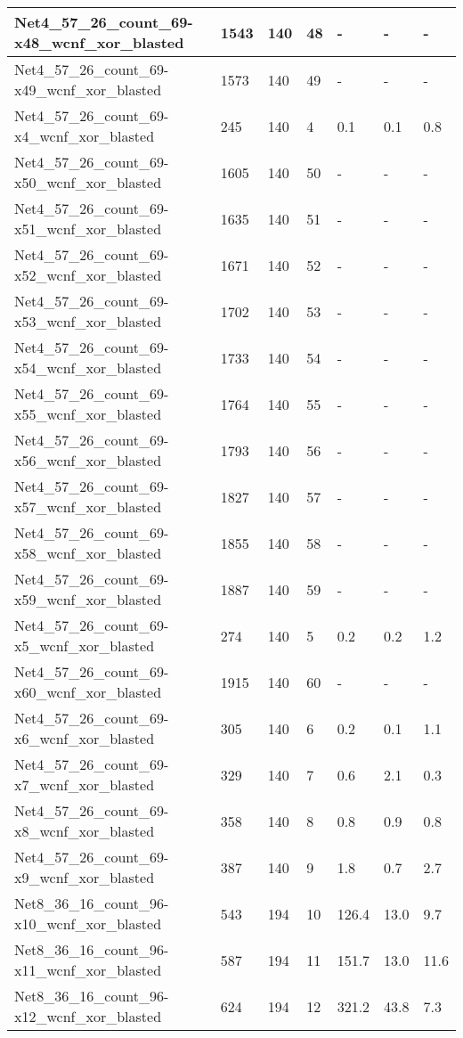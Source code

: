 \begin{scriptsize}
\begin{longtable}{|p{5cm}|l|l|l|l|l|l|}
Net4\_57\_26\_count\_69-x48\_wcnf\_xor\_blasted&1543&140&48&-&-&- \\ \hline 
Net4\_57\_26\_count\_69-x49\_wcnf\_xor\_blasted&1573&140&49&-&-&- \\ \hline 
Net4\_57\_26\_count\_69-x4\_wcnf\_xor\_blasted&245&140&4&0.1&0.1&0.8 \\ \hline 
Net4\_57\_26\_count\_69-x50\_wcnf\_xor\_blasted&1605&140&50&-&-&- \\ \hline 
Net4\_57\_26\_count\_69-x51\_wcnf\_xor\_blasted&1635&140&51&-&-&- \\ \hline 
Net4\_57\_26\_count\_69-x52\_wcnf\_xor\_blasted&1671&140&52&-&-&- \\ \hline 
Net4\_57\_26\_count\_69-x53\_wcnf\_xor\_blasted&1702&140&53&-&-&- \\ \hline 
Net4\_57\_26\_count\_69-x54\_wcnf\_xor\_blasted&1733&140&54&-&-&- \\ \hline 
Net4\_57\_26\_count\_69-x55\_wcnf\_xor\_blasted&1764&140&55&-&-&- \\ \hline 
Net4\_57\_26\_count\_69-x56\_wcnf\_xor\_blasted&1793&140&56&-&-&- \\ \hline 
Net4\_57\_26\_count\_69-x57\_wcnf\_xor\_blasted&1827&140&57&-&-&- \\ \hline 
Net4\_57\_26\_count\_69-x58\_wcnf\_xor\_blasted&1855&140&58&-&-&- \\ \hline 
Net4\_57\_26\_count\_69-x59\_wcnf\_xor\_blasted&1887&140&59&-&-&- \\ \hline 
Net4\_57\_26\_count\_69-x5\_wcnf\_xor\_blasted&274&140&5&0.2&0.2&1.2 \\ \hline 
Net4\_57\_26\_count\_69-x60\_wcnf\_xor\_blasted&1915&140&60&-&-&- \\ \hline 
Net4\_57\_26\_count\_69-x6\_wcnf\_xor\_blasted&305&140&6&0.2&0.1&1.1 \\ \hline 
Net4\_57\_26\_count\_69-x7\_wcnf\_xor\_blasted&329&140&7&0.6&2.1&0.3 \\ \hline 
Net4\_57\_26\_count\_69-x8\_wcnf\_xor\_blasted&358&140&8&0.8&0.9&0.8 \\ \hline 
Net4\_57\_26\_count\_69-x9\_wcnf\_xor\_blasted&387&140&9&1.8&0.7&2.7 \\ \hline 
Net8\_36\_16\_count\_96-x10\_wcnf\_xor\_blasted&543&194&10&126.4&13.0&9.7 \\ \hline 
Net8\_36\_16\_count\_96-x11\_wcnf\_xor\_blasted&587&194&11&151.7&13.0&11.6 \\ \hline 
Net8\_36\_16\_count\_96-x12\_wcnf\_xor\_blasted&624&194&12&321.2&43.8&7.3 \\ \hline 

\end{longtable}
\end{scriptsize}
